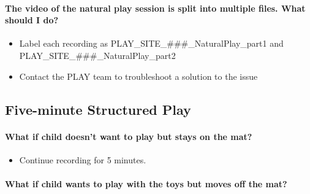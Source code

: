 \documentclass[
  12pt,
]{book}
\providecommand{\tightlist}{%
  \setlength{\itemsep}{0pt}\setlength{\parskip}{0pt}}
\begin{document}
\hypertarget{the-video-of-the-natural-play-session-is-split-into-multiple-files.-what-should-i-do}{%
\paragraph*{The video of the natural play session is split into multiple files. What should I do?}\label{the-video-of-the-natural-play-session-is-split-into-multiple-files.-what-should-i-do}}

\begin{itemize}
\tightlist
\item
  Label each recording as PLAY\_SITE\_\#\#\#\_NaturalPlay\_part1 and PLAY\_SITE\_\#\#\#\_NaturalPlay\_part2
\item
  Contact the PLAY team to troubleshoot a solution to the issue
\end{itemize}

\hypertarget{faqs_structured_play}{%
\subsection{Five-minute Structured Play}\label{faqs_structured_play}}

\hypertarget{what-if-child-doesnt-want-to-play-but-stays-on-the-mat}{%
\paragraph*{What if child doesn't want to play but stays on the mat?}\label{what-if-child-doesnt-want-to-play-but-stays-on-the-mat}}

\begin{itemize}
\tightlist
\item
  Continue recording for 5 minutes.
\end{itemize}

\hypertarget{what-if-child-wants-to-play-with-the-toys-but-moves-off-the-mat}{%
\paragraph*{What if child wants to play with the toys but moves off the mat?}\label{what-if-child-wants-to-play-with-the-toys-but-moves-off-the-mat}}
\end{document}
